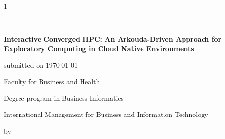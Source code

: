 \begin{spacing}{1}
    \begin{center}
        ~\vspace{0mm}


        {\sffamily
            \large
            \textbf{
                Interactive Converged HPC: An Arkouda-Driven Approach for Exploratory Computing in Cloud Native Environments
            }
            \bigskip
            \textbf{}
        }

        \vspace{15mm}

        {\Large \typMeinerArbeit}

        \vspace{1cm}

        submitted on \today

        \vspace{15mm}

        Faculty for Business and Health
        \medskip

        Degree program in Business Informatics

        \medskip

        International Management for Business and Information Technology

        \vspace{10mm}

        by

        \vspace{10mm}

        {\large\textsc{\meinName}}

        \vspace{10mm}
    \end{center}

    \vfill


\end{spacing}
